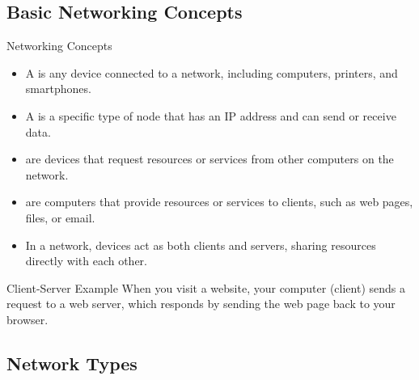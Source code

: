 \documentclass[aspectratio=169]{beamer}  %
\begin{document}
\subsection{Basic Networking Concepts}


\begin{frame}{Networking Concepts}
    \begin{itemize}
        \item A  is any device connected to a network, including computers, printers, and smartphones.
        \item A  is a specific type of node that has an IP address and can send or receive data.
        \item {} are devices that request resources or services from other computers on the network.
        \item {} are computers that provide resources or services to clients, such as web pages, files, or email.
        \item In a  network, devices act as both clients and servers, sharing resources directly with each other.
    \end{itemize}
    
    \begin{exampleblock}{Client-Server Example}
        When you visit a website, your computer (client) sends a request to a web server, which responds by sending the web page back to your browser.
    \end{exampleblock}
\end{frame}


\subsection{Network Types}

\end{document}
